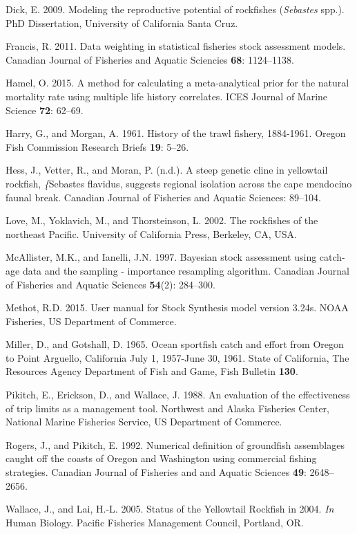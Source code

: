 \documentclass[12pt,]{article}
\begin{document}
\hypertarget{ref-Dick2009}{}
Dick, E. 2009. Modeling the reproductive potential of rockfishes
(\emph{Sebastes} spp.). PhD Dissertation, University of California Santa
Cruz.

\hypertarget{ref-Francis2011}{}
Francis, R. 2011. Data weighting in statistical fisheries stock
assessment models. Canadian Journal of Fisheries and Aquatic Sciencies
\textbf{68}: 1124--1138.

\hypertarget{ref-Hamel2015}{}
Hamel, O. 2015. A method for calculating a meta-analytical prior for the
natural mortality rate using multiple life history correlates. ICES
Journal of Marine Science \textbf{72}: 62--69.

\hypertarget{ref-Harry1961}{}
Harry, G., and Morgan, A. 1961. History of the trawl fishery, 1884-1961.
Oregon Fish Commission Research Briefs \textbf{19}: 5--26.

\hypertarget{ref-Hess2011}{}
Hess, J., Vetter, R., and Moran, P. (n.d.). A steep genetic cline in
yellowtail rockfish, \emph{\{}Sebastes flavidus, suggests regional
isolation across the cape mendocino faunal break. Canadian Journal of
Fisheries and Aquatic Sciences: 89--104.

\hypertarget{ref-Love2002}{}
Love, M., Yoklavich, M., and Thorsteinson, L. 2002. The rockfishes of
the northeast Pacific. University of California Press, Berkeley, CA,
USA.

\hypertarget{ref-McAllister1997}{}
McAllister, M.K., and Ianelli, J.N. 1997. Bayesian stock assessment
using catch-age data and the sampling - importance resampling algorithm.
Canadian Journal of Fisheries and Aquatic Sciences \textbf{54}(2):
284--300.

\hypertarget{ref-Methot2015}{}
Methot, R.D. 2015. User manual for Stock Synthesis model version 3.24s.
NOAA Fisheries, US Department of Commerce.

\hypertarget{ref-Miller1965}{}
Miller, D., and Gotshall, D. 1965. Ocean sportfish catch and effort from
Oregon to Point Arguello, California July 1, 1957-June 30, 1961. State
of California, The Resources Agency Department of Fish and Game, Fish
Bulletin \textbf{130}.

\hypertarget{ref-Pikitch1988}{}
Pikitch, E., Erickson, D., and Wallace, J. 1988. An evaluation of the
effectiveness of trip limits as a management tool. Northwest and Alaska
Fisheries Center, National Marine Fisheries Service, US Department of
Commerce.

\hypertarget{ref-Rogers1992}{}
Rogers, J., and Pikitch, E. 1992. Numerical definition of groundfish
assemblages caught off the coasts of Oregon and Washington using
commercial fishing strategies. Canadian Journal of Fisheries and and
Aquatic Sciences \textbf{49}: 2648--2656.

\hypertarget{ref-Wallace2005}{}
Wallace, J., and Lai, H.-L. 2005. Status of the Yellowtail Rockfish in
2004. \emph{In} Human Biology. Pacific Fisheries Management Council,
Portland, OR.
\end{document}
